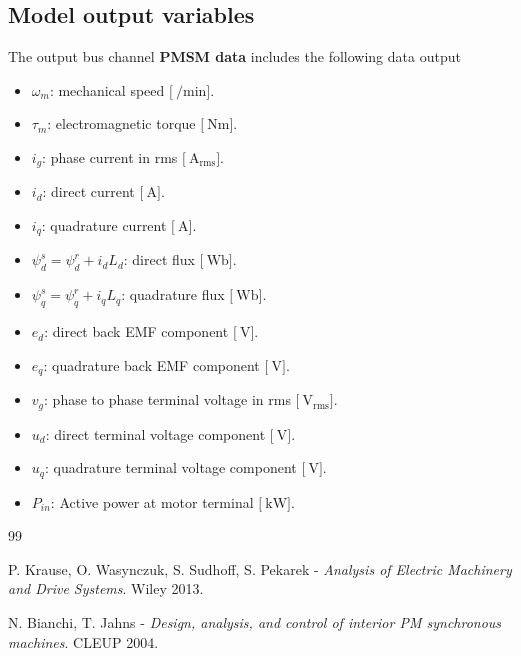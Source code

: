 \documentclass[12pt,a4paper]{scrartcl}
\begin{document}
\begin{onehalfspace}
\section{Model output variables}
The output bus channel \textbf{PMSM data} includes the following data output
\begin{itemize}
	\item[$-$] $\omega_m$: mechanical speed $\Big[\SI{}{\per\minute}\Big]$.
	\item[$-$] $\tau_m$: electromagnetic torque $\Big[\SI{}{\newton\meter}\Big]$.
	\item[$-$] $i_g$: phase current in rms $\Big[\SI{}{\ampere}_\text{rms}\Big]$.	
	\item[$-$] $i_d$: direct current $\Big[\SI{}{\ampere}\Big]$.	
	\item[$-$] $i_q$: quadrature current $\Big[\SI{}{\ampere}\Big]$.
	\item[$-$] $\psi_d^s=\psi_d^r+i_dL_d$: direct flux $\Big[\SI{}{\weber}\Big]$.	
	\item[$-$] $\psi_q^s=\psi_q^r+i_qL_q$: quadrature flux $\Big[\SI{}{\weber}\Big]$.	
	\item[$-$] $e_d$: direct back EMF component $\Big[\SI{}{\volt}\Big]$.	
	\item[$-$] $e_q$: quadrature back EMF component $\Big[\SI{}{\volt}\Big]$.
	\item[$-$] $v_g$: phase to phase terminal voltage in rms $\Big[\SI{}{\volt}_\text{rms}\Big]$.		
	\item[$-$] $u_d$: direct terminal voltage component $\Big[\SI{}{\volt}\Big]$.	
	\item[$-$] $u_q$: quadrature terminal voltage component $\Big[\SI{}{\volt}\Big]$.
	\item[$-$] $P_{in}$: Active power at motor terminal $\Big[\SI{}{\kilo\watt}\Big]$.	
\end{itemize}

\begin{thebibliography}{99}

	 P. Krause, O. Wasynczuk, S. Sudhoff, S. Pekarek - \textit{Analysis of Electric Machinery and Drive Systems}. Wiley 2013.
			
	 N. Bianchi, T. Jahns - \textit{Design, analysis, and control of interior PM synchronous machines}. CLEUP 2004.
	
\end{thebibliography}
\end{onehalfspace}
\end{document}
